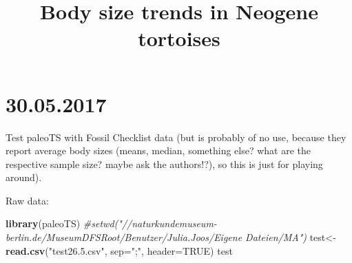 \documentclass[]{article}
\title{Body size trends in Neogene tortoises}
\author{}
\date{}
\newenvironment{Shaded}{\begin{snugshade}}{\end{snugshade}}
\newcommand{\KeywordTok}[1]{\textcolor[rgb]{0.13,0.29,0.53}{\textbf{{#1}}}}
\newcommand{\DataTypeTok}[1]{\textcolor[rgb]{0.13,0.29,0.53}{{#1}}}
\newcommand{\StringTok}[1]{\textcolor[rgb]{0.31,0.60,0.02}{{#1}}}
\newcommand{\CommentTok}[1]{\textcolor[rgb]{0.56,0.35,0.01}{\textit{{#1}}}}
\newcommand{\OtherTok}[1]{\textcolor[rgb]{0.56,0.35,0.01}{{#1}}}
\newcommand{\NormalTok}[1]{{#1}}
\begin{document}
\maketitle

\section{30.05.2017}\label{section}

Test paleoTS with Fossil Checklist data (but is probably of no use,
because they report average body sizes (means, median, something else?
what are the respective sample size? maybe ask the authors!?), so this
is just for playing around).

Raw data:

\begin{Shaded}
\begin{Highlighting}[]
\KeywordTok{library}\NormalTok{(paleoTS)}
\CommentTok{#setwd("//naturkundemuseum-berlin.de/MuseumDFSRoot/Benutzer/Julia.Joos/Eigene Dateien/MA")}
\NormalTok{test<-}\KeywordTok{read.csv}\NormalTok{(}\StringTok{"test26.5.csv"}\NormalTok{, }\DataTypeTok{sep=}\StringTok{";"}\NormalTok{, }\DataTypeTok{header=}\OtherTok{TRUE}\NormalTok{)}
\NormalTok{test}
\end{Highlighting}
\end{Shaded}
\end{document}
